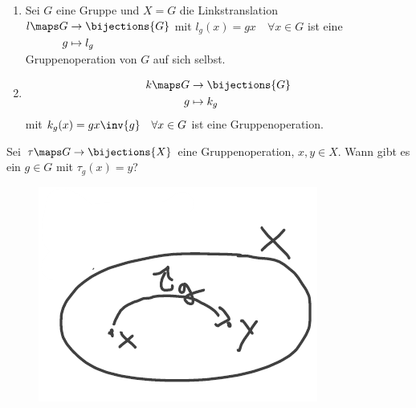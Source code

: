 \begin{beispiel}\label{operation:beispiele}
    \begin{enumerate}
        \item \label{operation:beispiele:linkstranslation} Sei \( G \) eine Gruppe und \( X=G \) die Linkstranslation \( l\maps \begin{aligned}[t] 
            G&\to \bijections{G}\\
            g&\mapsto l_g
        \end{aligned} \) mit \( l_g(x)=gx \quad\forall x\in G \) ist eine Gruppenoperation von \( G \) auf sich selbst.
        
        \item \label{operation:beispiele:konjugation}\begin{align*}
            k\maps \begin{aligned}[t] 
                G &\to \bijections{G}\\
                g &\mapsto k_g
            \end{aligned}
        \end{align*}
        mit \( k_g(x)=gx\inv{g} \quad\forall x\in G \) ist eine Gruppenoperation.
    \end{enumerate}
\end{beispiel}
\begin{frage*}
    Sei \( \tau\maps G\to \bijections{X} \) eine Gruppenoperation, \( x,y\in X \). 
    Wann gibt es ein \( g\in G \) mit \( \tau_g(x)=y \)?
    \begin{figure}[H]
        \centering
        \includegraphics[width=0.5\linewidth]{figures/einfach_transitiv}
        \label{fig:einfach_transitiv}
    \end{figure}
    
\end{frage*}

